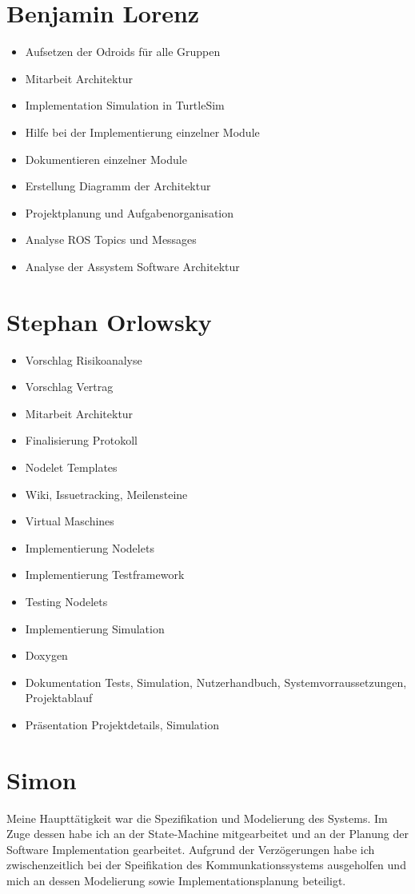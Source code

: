\documentclass[a4paper, 12pt, titlepage]{scrartcl}
\begin{document}
{	\section{Benjamin Lorenz}
	\begin{itemize}
		\item Aufsetzen der Odroids für alle Gruppen
		\item Mitarbeit Architektur
		\item Implementation Simulation in TurtleSim
		\item Hilfe bei der Implementierung einzelner Module 
		\item Dokumentieren einzelner Module
		\item Erstellung Diagramm der Architektur
		\item Projektplanung und Aufgabenorganisation
		\item Analyse ROS Topics und Messages
		\item Analyse der Assystem Software Architektur
	\end{itemize}
	\section{Stephan Orlowsky}
	\begin{itemize}
		\item Vorschlag Risikoanalyse
		\item Vorschlag Vertrag
		\item Mitarbeit Architektur
		\item Finalisierung Protokoll
		\item Nodelet Templates
		\item Wiki, Issuetracking, Meilensteine
		\item Virtual Maschines
		\item Implementierung Nodelets
		\item Implementierung Testframework
		\item Testing Nodelets
		\item Implementierung Simulation
		\item Doxygen
		\item Dokumentation Tests, Simulation, Nutzerhandbuch, Systemvorraussetzungen, Projektablauf
		\item Präsentation Projektdetails, Simulation
	\end{itemize}
	\section{Simon}
	Meine Haupttätigkeit war die Spezifikation und Modelierung des Systems. Im Zuge dessen habe ich an der 
	State-Machine mitgearbeitet und an der Planung der Software Implementation gearbeitet.
	Aufgrund der Verzögerungen habe ich zwischenzeitlich bei der Speifikation des Kommunkationssystems
	ausgeholfen und mich an dessen Modelierung sowie Implementationsplanung beteiligt.
	
}
\end{document}
